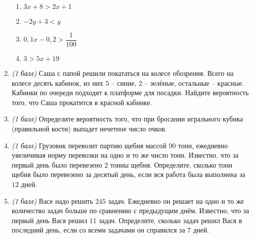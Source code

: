 \documentclass[12pt, a4paper]{article}
\begin{document}
\begin{enumerate}
\begin{multicols}{2}
\begin{enumerate}[label=\asbuk*)]
				\item $3x+8>2x+1$
				\item $-2y+3<y$
				\item $0,1x-0,2>\dfrac{1}{100}$
				\item $3>5x+19$
			\end{enumerate}
		\end{multicols}
		\item \textit{(1 балл)} Саша с папой решили покататься на колесе обозрения. Всего на колесе десять кабинок, из них $5$ – синие, $2$ – зелёные, остальные – красные. Кабинки по очереди подходят к платформе для посадки. Найдите вероятность того, что Саша прокатится в красной кабинке.
		\item \textit{(1 балл)} Определите вероятность того, что при бросании игрального кубика (правильной кости) выпадет нечетное число очков.
		\item \textit{(1 балл)} Грузовик перевозит партию щебня массой $90$ тонн, ежедневно увеличивая норму перевозки на одно и то же число тонн. Известно, что за первый день было перевезено $2$ тонны щебня. Определите, сколько тонн щебня было перевезено за десятый день, если вся работа была выполнена за $12$ дней.
		\item \textit{(1 балл)} Васе надо решить $245$ задач. Ежедневно он решает на одно и то же количество задач больше по сравнению с предыдущим днём. Известно, что за первый день Вася решил $11$ задач. Определите, сколько задач решил Вася в последний день, если со всеми задачами он справился за $7$ дней.
	\end{enumerate}
\end{document}
